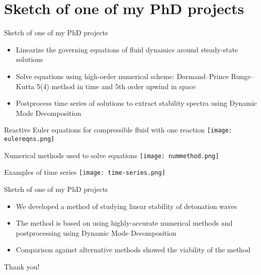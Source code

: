 \documentclass[11pt,aspectratio=169,t]{beamer}
\begin{document}
\section{Sketch of one of my PhD projects}

\begin{frame}{Sketch of one of my PhD projects}
    \vspace{3em}
    \begin{itemize}
        \item Linearize the governing equations of fluid dynamics
              around steady-state solutions
        \item Solve equations using high-order numerical scheme:
        Dormand--Prince Runge--Kutta 5(4) method in time and 5th order upwind
        in space
        \item Postprocess time series of solutions to extract stability spectra
        using Dynamic Mode Decomposition
    \end{itemize}
    \end{frame}

\begin{frame}{Reactive Euler equations for compressible fluid with one reaction}
\centering
\texttt{[image: eulereqns.png]}
\end{frame}


\begin{frame}{Numerical methods used to solve equations}
\centering
\texttt{[image: nummethod.png]}
\end{frame}

\begin{frame}{Examples of time series}
\centering
\texttt{[image: time-series.png]}
\end{frame}

\begin{frame}{Sketch of one of my PhD projects}
\vspace{3em}
\begin{itemize}
    \item We developed a method of studying linear stability of detonation waves
    \item The method is based on using highly-accurate numerical methods and
            postprocessing using Dynamic Mode Decomposition
    \item Comparison against alternative methods showed the viability
            of the method
\end{itemize}
\end{frame}

\begin{frame}[standout]
\centering
\Huge
Thank you!
\end{frame}
\end{document}
